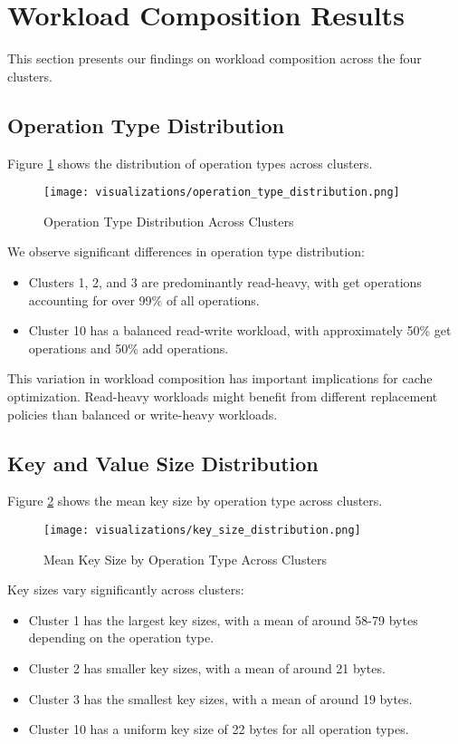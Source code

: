 \documentclass[conference]{IEEEtran}
\begin{document}
\section{Workload Composition Results}
This section presents our findings on workload composition across the four clusters.

\subsection{Operation Type Distribution}
Figure \ref{fig:operation_type} shows the distribution of operation types across clusters.

\begin{figure}[htbp]
    \centering
    \texttt{[image: visualizations/operation\_type\_distribution.png]}
    \caption{Operation Type Distribution Across Clusters}
    \label{fig:operation_type}
\end{figure}

We observe significant differences in operation type distribution:
\begin{itemize}
    \item Clusters 1, 2, and 3 are predominantly read-heavy, with get operations accounting for over 99\% of all operations.
    \item Cluster 10 has a balanced read-write workload, with approximately 50\% get operations and 50\% add operations.
\end{itemize}

This variation in workload composition has important implications for cache optimization. Read-heavy workloads might benefit from different replacement policies than balanced or write-heavy workloads.

\subsection{Key and Value Size Distribution}
Figure \ref{fig:key_size} shows the mean key size by operation type across clusters.

\begin{figure}[htbp]
    \centering
    \texttt{[image: visualizations/key\_size\_distribution.png]}
    \caption{Mean Key Size by Operation Type Across Clusters}
    \label{fig:key_size}
\end{figure}

Key sizes vary significantly across clusters:
\begin{itemize}
    \item Cluster 1 has the largest key sizes, with a mean of around 58-79 bytes depending on the operation type.
    \item Cluster 2 has smaller key sizes, with a mean of around 21 bytes.
    \item Cluster 3 has the smallest key sizes, with a mean of around 19 bytes.
    \item Cluster 10 has a uniform key size of 22 bytes for all operation types.
\end{itemize}
\end{document}

